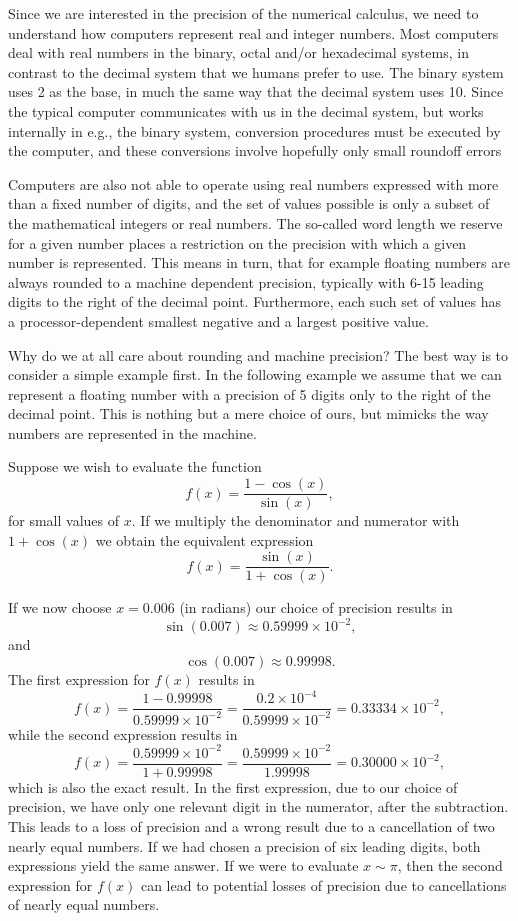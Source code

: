 Since we are interested in the precision of the numerical
calculus, we need to understand how computers
represent real and integer numbers.
Most computers deal with real numbers in the binary, octal and/or hexadecimal systems,
in contrast to the decimal system that we humans 
prefer to use. 
The binary system uses 2 as the base, in much the same way that the
decimal system uses 10. Since the typical computer communicates 
with us in the decimal system, but works internally in e.g., the binary 
system, conversion procedures must be executed by the computer,
and these conversions involve hopefully only small roundoff errors

Computers are also not able to operate using real numbers 
expressed with more than a fixed number of digits,  and the  
set of values possible is only a 
subset of the mathematical integers or real numbers. 
The so-called word length we reserve for a given number
places a restriction on the precision with which a given
number is represented.
This means in turn, that for example floating numbers are always
rounded to a machine dependent precision, typically with
6-15 leading digits to the right of the decimal point. 
Furthermore,
each such set of values has a processor-dependent
smallest negative and a largest positive value. 


Why do we at all care about rounding and machine precision? 
The best way is to consider a simple example first.
In the following example we
assume that we can represent a floating number with a precision
of 5 digits only to the right of the decimal point.
This is nothing but a mere choice of ours, but mimicks
the way numbers are represented in the machine.

Suppose we wish to evaluate the function
\[
   f(x)=\frac{1-\cos{(x)}}{\sin{(x)}},
\]
for small values of $x$. If we multiply the denominator and numerator
with $1+\cos{(x)}$ we obtain the equivalent expression
\[
   f(x)=\frac{\sin{(x)}}{1+\cos{(x)}}.
\]

If we now choose $x=0.006$ (in radians) our choice of precision results in
\[
   \sin{(0.007)}\approx 0.59999\times 10^{-2},
\]
and
\[
   \cos{(0.007)}\approx 0.99998.
\]
The first expression for $f(x)$ results in
\[
   f(x)=\frac{1-0.99998}{0.59999\times 10^{-2}}=\frac{0.2\times 10^{-4}}{0.59999\times 10^{-2}}=0.33334\times 10^{-2},
\]
while the second expression results in
\[
   f(x)=\frac{0.59999\times 10^{-2}}{1+0.99998}=
\frac{0.59999\times 10^{-2}}{1.99998}=0.30000\times 10^{-2},
\]
which is also the exact result. In the first expression, due to our
choice of precision, we have  
only one relevant digit in the numerator, after the 
subtraction. This leads to a loss of precision and a wrong result due to
a cancellation of two nearly equal numbers. 
If we had chosen a precision of six leading digits, both expressions
yield the same answer.
If we were to evaluate $x\sim \pi$, then the second expression for $f(x)$ 
can lead to potential losses of precision due to cancellations of nearly
equal numbers. 


